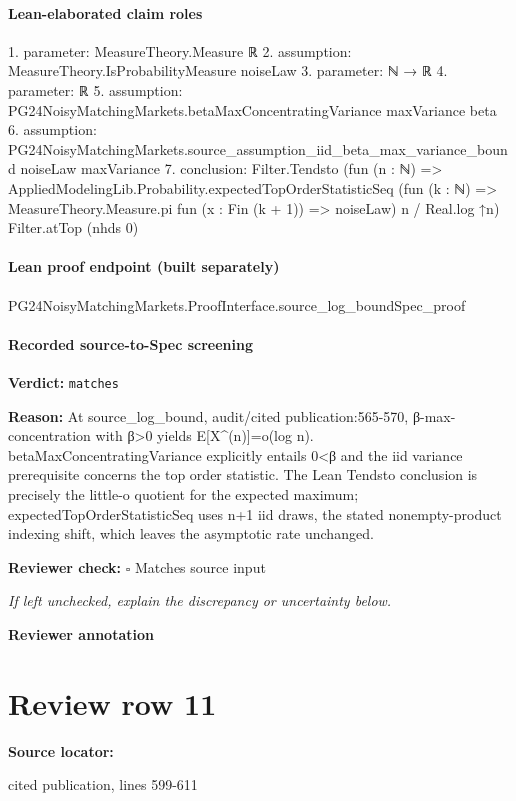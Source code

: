 \documentclass[10pt]{article}
\newcommand{\reviewerbox}{%
  \par\noindent\fbox{\parbox{0.96\linewidth}{\rule{0pt}{0.38in}}}\par
}
\newcommand{\reviewmatch}[1]{%
  \par\noindent\textbf{Reviewer check:} $\square$\; #1\par
  \noindent\emph{If left unchecked, explain the discrepancy or uncertainty below.}\par
}
\begin{document}
\paragraph{Lean-elaborated claim roles}\begin{ReviewVerbatim}
1. parameter: MeasureTheory.Measure ℝ
2. assumption: MeasureTheory.IsProbabilityMeasure noiseLaw
3. parameter: ℕ → ℝ
4. parameter: ℝ
5. assumption: PG24NoisyMatchingMarkets.betaMaxConcentratingVariance maxVariance beta
6. assumption: PG24NoisyMatchingMarkets.source_assumption_iid_beta_max_variance_bound noiseLaw maxVariance
7. conclusion: Filter.Tendsto
  (fun (n : ℕ) =>
    AppliedModelingLib.Probability.expectedTopOrderStatisticSeq
        (fun (k : ℕ) => MeasureTheory.Measure.pi fun (x : Fin (k + 1)) => noiseLaw) n /
      Real.log ↑n)
  Filter.atTop (nhds 0)
\end{ReviewVerbatim}

\paragraph{Lean proof endpoint (built separately)}\begin{ReviewVerbatim}
PG24NoisyMatchingMarkets.ProofInterface.source_log_boundSpec_proof
\end{ReviewVerbatim}

\paragraph{Recorded source-to-Spec screening}
\textbf{Verdict:} \texttt{matches}
\\
{\raggedright
\textbf{Reason:} At source\_\allowbreak{}log\_\allowbreak{}bound, audit/\allowbreak{}cited publication:\allowbreak{}565-\allowbreak{}570, β-\allowbreak{}max-\allowbreak{}concentration with β>0 yields E[X\textasciicircum{}(n)]=o(log n).\allowbreak{} betaMaxConcentratingVariance explicitly entails 0<β and the iid variance prerequisite concerns the top order statistic.\allowbreak{} The Lean Tendsto conclusion is precisely the little-\allowbreak{}o quotient for the expected maximum;\allowbreak{} expectedTopOrderStatisticSeq uses n+1 iid draws, the stated nonempty-\allowbreak{}product indexing shift, which leaves the asymptotic rate unchanged.\allowbreak{}
\par}
\reviewmatch{Matches source input}
\noindent\textbf{Reviewer annotation}\par
\reviewerbox
\clearpage
\hypertarget{source-claim-331214905b993ae6}{}
\section*{Review row 11}
\textbf{Source locator:} {\footnotesize\raggedright cited publication, lines 599-\allowbreak{}611\par}
\end{document}
